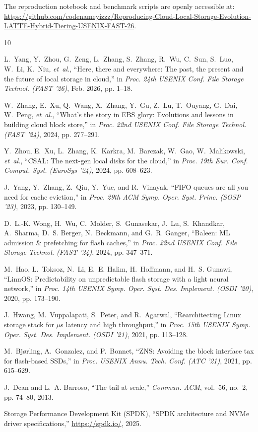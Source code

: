 \documentclass[lettersize,journal]{IEEEtran}
\begin{document}
The reproduction notebook and benchmark scripts are openly accessible at: \url{https://github.com/codenameyizzz/Reproducing-Cloud-Local-Storage-Evolution-LATTE-Hybrid-Tiering-USENIX-FAST-26}.


\begin{thebibliography}{10}

L.~Yang, Y.~Zhou, G.~Zeng, L.~Zhang, S.~Zhang, R.~Wu, C.~Sun, S.~Luo, W.~Li, K.~Niu, \emph{et~al.},
``Here, there and everywhere: The past, the present and the future of local storage in cloud,''
in \emph{Proc. 24th USENIX Conf. File Storage Technol. (FAST '26)}, Feb. 2026, pp. 1--18.

W.~Zhang, E.~Xu, Q.~Wang, X.~Zhang, Y.~Gu, Z.~Lu, T.~Ouyang, G.~Dai, W.~Peng, \emph{et~al.},
``What's the story in EBS glory: Evolutions and lessons in building cloud block store,''
in \emph{Proc. 22nd USENIX Conf. File Storage Technol. (FAST '24)}, 2024, pp. 277--291.

Y.~Zhou, E.~Xu, L.~Zhang, K.~Karkra, M.~Barczak, W.~Gao, W.~Malikowski, \emph{et~al.},
``CSAL: The next-gen local disks for the cloud,''
in \emph{Proc. 19th Eur. Conf. Comput. Syst. (EuroSys '24)}, 2024, pp. 608--623.

J.~Yang, Y.~Zhang, Z.~Qiu, Y.~Yue, and R.~Vinayak,
``FIFO queues are all you need for cache eviction,''
in \emph{Proc. 29th ACM Symp. Oper. Syst. Princ. (SOSP '23)}, 2023, pp. 130--149.

D.~L.-K. Wong, H.~Wu, C.~Molder, S.~Gunasekar, J.~Lu, S.~Khandkar, A.~Sharma, D.~S. Berger, N.~Beckmann, and G.~R. Ganger,
``Baleen: ML admission \& prefetching for flash caches,''
in \emph{Proc. 22nd USENIX Conf. File Storage Technol. (FAST '24)}, 2024, pp. 347--371.

M.~Hao, L.~Toksoz, N.~Li, E.~E. Halim, H.~Hoffmann, and H.~S. Gunawi,
``LinnOS: Predictability on unpredictable flash storage with a light neural network,''
in \emph{Proc. 14th USENIX Symp. Oper. Syst. Des. Implement. (OSDI '20)}, 2020, pp. 173--190.

J.~Hwang, M.~Vuppalapati, S.~Peter, and R.~Agarwal,
``Rearchitecting Linux storage stack for $\mu$s latency and high throughput,''
in \emph{Proc. 15th USENIX Symp. Oper. Syst. Des. Implement. (OSDI '21)}, 2021, pp. 113--128.

M.~Bj{\o}rling, A.~Gonzalez, and P.~Bonnet,
``ZNS: Avoiding the block interface tax for flash-based SSDs,''
in \emph{Proc. USENIX Annu. Tech. Conf. (ATC '21)}, 2021, pp. 615--629.

J.~Dean and L.~A. Barroso,
``The tail at scale,''
\emph{Commun. ACM}, vol.~56, no.~2, pp. 74--80, 2013.

Storage Performance Development Kit (SPDK),
``SPDK architecture and NVMe driver specifications,''
\url{https://spdk.io/}, 2025.

\end{thebibliography}
\end{document}
